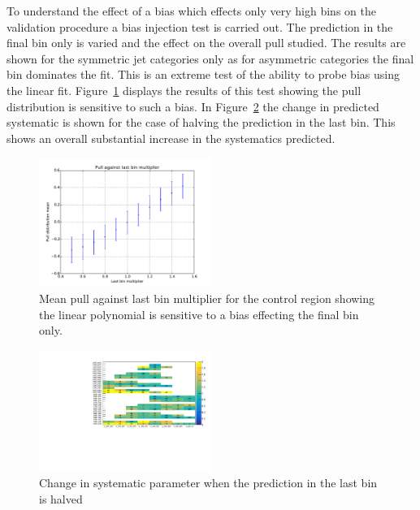 \label{sec:biasInj}
To understand the effect of a bias which effects only very high 
\mht bins on the validation procedure a bias injection test is carried out.
The prediction in the final bin only is varied and the effect on the 
overall pull studied. The results are shown for the symmetric jet categories only
as for asymmetric categories the final \mht bin dominates the fit. This is 
an extreme test of the ability to probe bias using the linear fit. 
Figure~\ref{fig:biasInjTest} displays the results of this test showing
the pull distribution is sensitive to such a bias. In Figure~\ref{fig:biasSyst} the 
change in predicted systematic is shown for the case of halving the prediction in the last bin. 
This shows an overall substantial increase in the systematics predicted.

\begin{figure}[]
  \centering
  \includegraphics[width=0.5\textwidth]{figures/template/biasInjTest.pdf}
  \caption{\label{fig:biasInjTest} Mean pull against last bin multiplier for 
  the \mj control region showing the linear polynomial is sensitive to a bias effecting the final bin only.}
\end{figure}

\begin{figure}[]
  \centering
  \includegraphics[width=0.5\textwidth]{figures/template/biasSystTest.pdf}
  \caption{\label{fig:biasSyst} Change in systematic parameter when the prediction in the last bin
  is halved}
\end{figure}

